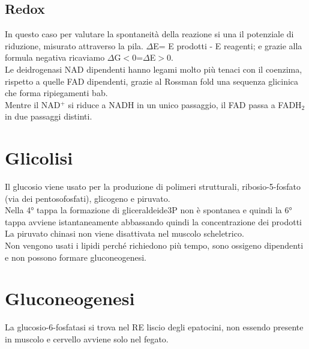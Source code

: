 \documentclass[10pt]{article}
\begin{document}
\subsection*{Redox}
In questo caso per valutare la spontaneità della reazione si una il potenziale di riduzione, misurato attraverso la pila. $\Delta$E= E prodotti - E reagenti; e grazie alla formula negativa ricaviamo $\Delta$G$<0$=$\Delta$E$>0$.\\
Le deidrogenasi NAD dipendenti hanno legami molto più tenaci con il coenzima, rispetto a quelle FAD dipendenti, grazie al Rossman fold una sequenza glicinica che forma ripiegamenti bab.\\
Mentre il NAD$^+$ si riduce a NADH in un unico passaggio, il FAD passa a FADH$_2$ in due passaggi distinti.
\section*{Glicolisi}
Il glucosio viene usato per la produzione di polimeri strutturali, ribosio-5-fosfato (via dei pentosofosfati), glicogeno e piruvato.\\
Nella 4° tappa la formazione di gliceraldeide3P non è spontanea e quindi la 6° tappa avviene istantaneamente abbassando quindi la concentrazione dei prodotti\\
La piruvato chinasi non viene disattivata nel muscolo scheletrico.\\
Non vengono usati i lipidi perché richiedono più tempo, sono ossigeno dipendenti e non possono formare gluconeogenesi. 
\section*{Gluconeogenesi} 
La glucosio-6-fosfatasi si trova nel RE liscio degli epatocini, non essendo presente in muscolo e cervello avviene solo nel fegato. 
\end{document}
